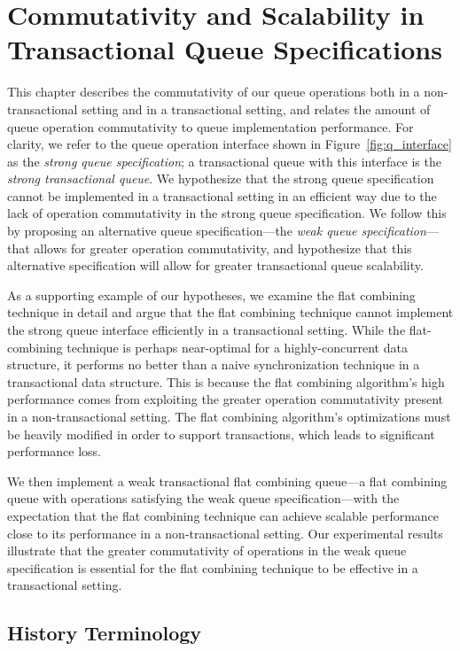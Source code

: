 \chapter{Commutativity and Scalability in Transactional Queue Specifications}
\label{commutativity}

This chapter describes the commutativity of our queue operations both in a non-transactional setting and in a transactional setting, and relates the amount of queue operation commutativity to queue implementation performance. For clarity, we refer to the queue operation interface shown in Figure~\ref{fig:q_interface} as the \emph{strong queue specification}; a transactional queue with this interface is the \emph{strong transactional queue}. We hypothesize that the strong queue specification cannot be implemented in a transactional setting in an efficient way due to the lack of operation commutativity in the strong queue specification. 
We follow this by proposing an alternative queue specification---the \emph{weak queue specification}---that allows for greater operation commutativity, and hypothesize that this alternative specification will allow for greater transactional queue scalability.

As a supporting example of our hypotheses, we examine the flat combining technique in detail and argue that the flat combining technique cannot implement the strong queue interface efficiently in a transactional setting. While the flat-combining technique is perhaps near-optimal for a highly-concurrent data structure, it performs no better than a naive synchronization technique in a transactional data structure. This is because the flat combining algorithm's high performance comes from exploiting the greater operation commutativity present in a non-transactional setting. The flat combining algorithm's optimizations must be heavily modified in order to support transactions, which leads to significant performance loss. 

We then implement a weak transactional flat combining queue---a flat combining queue with operations satisfying the weak queue specification---with the expectation that the flat combining technique can achieve scalable performance close to its performance in a non-transactional setting. Our experimental results illustrate that the greater commutativity of operations in the weak queue specification is essential for the flat combining technique to be effective in a transactional setting.

\section{History Terminology}

